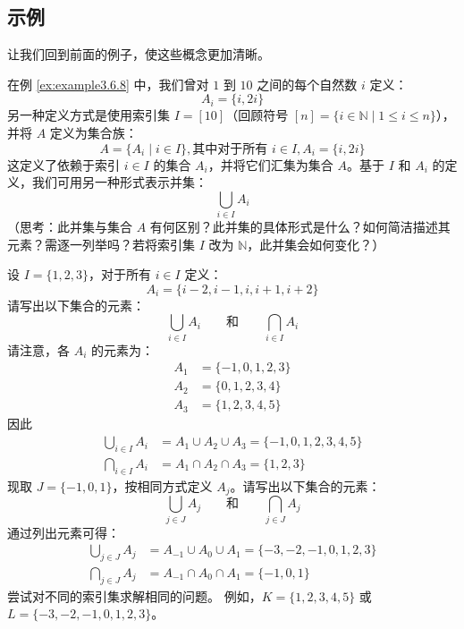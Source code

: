 \subsection{示例}

让我们回到前面的例子，使这些概念更加清晰。

\begin{example}
    在例 \ref{ex:example3.6.8} 中，我们曾对 $1$ 到 $10$ 之间的每个自然数 $i$ 定义：
    \[A_i = \{i, 2i\}\]
    另一种定义方式是使用索引集 $I = [10]$（回顾符号 $[n] = \{i \in \mathbb{N} \mid 1 \le i \le n\}$），并将 $A$ 定义为集合族：
    \[A = \{A_i \mid i \in I\}, \text{其中对于所有\ } i \in I, A_i = \{i, 2i\}\]
    这定义了依赖于索引 $i \in I$ 的集合 $A_i$，并将它们汇集为集合 $A$。基于 $I$ 和 $A_i$ 的定义，我们可用另一种形式表示并集：
    \[\bigcup_{i \in I} A_i\]
    （思考：此并集与集合 $A$ 有何区别？此并集的具体形式是什么？如何简洁描述其元素？需逐一列举吗？若将索引集 $I$ 改为 $\mathbb{N}$，此并集会如何变化？）
\end{example}

\begin{example}
    设 $I = \{1, 2, 3\}$，对于所有 $i \in I$ 定义：
    \[A_i = \{i - 2, i - 1, i, i + 1, i + 2\}\]
    请写出以下集合的元素：
    \[\bigcup_{i \in I} A_i \qquad\text{和}\qquad \bigcap_{i \in I} A_i\]
    请注意，各 $A_i$ 的元素为：
    \begin{align*}
        A_1 &= \{-1, 0, 1, 2, 3\} \\
        A_2 &= \{0, 1, 2, 3, 4\} \\
        A_3 &= \{1, 2, 3, 4, 5\}
    \end{align*}
    因此
    \begin{align*}
        \bigcup_{i \in I} A_i &= A_1 \cup A_2 \cup A_3 = \{-1, 0, 1, 2, 3, 4, 5\} \\
        \bigcap_{i \in I} A_i &= A_1 \cap A_2 \cap A_3 = \{1, 2, 3\}
    \end{align*}
    现取 $J = \{-1, 0, 1\}$，按相同方式定义 $A_j$。请写出以下集合的元素：
    \[\bigcup_{j \in J} A_j \qquad\text{和}\qquad \bigcap_{j \in J} A_j\]
    通过列出元素可得：
    \begin{align*}
        \bigcup_{j \in J} A_j &= A_{-1} \cup A_0 \cup A_1 = \{-3, -2, -1, 0, 1, 2, 3\} \\
        \bigcap_{j \in J} A_j &= A_{-1} \cap A_0 \cap A_1 = \{-1, 0, 1\}
    \end{align*}
    尝试对不同的索引集求解相同的问题。
    例如，$K = \{1, 2, 3, 4, 5\}$ 或 $L = \{-3, -2, -1, 0, 1, 2, 3\}$。
\end{example}

